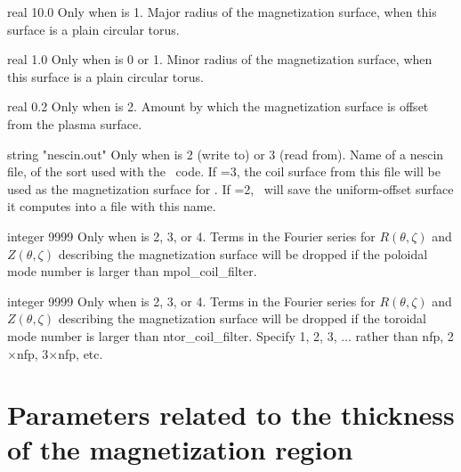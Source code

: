 \myhrule

{real}
{10.0}
{Only when  is 1.}
{Major radius of the magnetization surface, when this surface is a plain circular torus.}

\myhrule

{real}
{1.0}
{Only when  is 0 or 1.}
{Minor radius of the magnetization surface, when this surface is a plain circular torus.}


\myhrule

{real}
{0.2}
{Only when  is 2.}
{Amount by which the magnetization surface is offset from the plasma surface.}

\myhrule

{string}
{{\ttfamily "nescin.out"}}
{Only when  is 2 (write to) or 3 (read from).}
{Name of a {\ttfamily nescin} file, of the sort used with the \nescoil~code.
If =3, the coil surface from
this file will be used as the magnetization surface for \regcoil. 
If =2, \regcoil~will save the uniform-offset surface it computes
into a file with this name.}

\myhrule

{integer}
{9999}
{Only when  is 2, 3, or 4.}
{Terms in the Fourier series for $R(\theta,\zeta)$ and $Z(\theta,\zeta)$ describing the magnetization surface will be dropped if the poloidal mode number is larger than {\ttfamily mpol\_coil\_filter}.}

\myhrule

{integer}
{9999}
{Only when  is 2, 3, or 4.}
{Terms in the Fourier series for $R(\theta,\zeta)$ and $Z(\theta,\zeta)$ describing the magnetization surface will be dropped if the toroidal mode number is larger than {\ttfamily ntor\_coil\_filter}. Specify 1, 2, 3, $\ldots$ rather than {\ttfamily nfp}, 2$\times${\ttfamily nfp}, 3$\times${\ttfamily nfp}, etc.}

\myhrule

\section{Parameters related to the thickness of the magnetization region}

